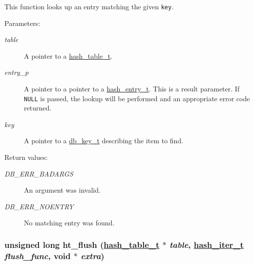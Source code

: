 This function looks up an entry matching the given {\tt key}.\begin{Desc}
\item[Parameters: ]\par
\begin{description}
\item[{\em 
table}]A pointer to a \hyperlink{group__dbprim__hash_a0}{hash\_\-table\_\-t}. \item[{\em 
entry\_\-p}]A pointer to a pointer to a \hyperlink{group__dbprim__hash_a1}{hash\_\-entry\_\-t}. This is a result parameter. If {\tt NULL} is passed, the lookup will be performed and an appropriate error code returned.  \item[{\em 
key}]A pointer to a \hyperlink{group__dbprim_a0}{db\_\-key\_\-t} describing the item to find.\end{description}
\end{Desc}
\begin{Desc}
\item[Return values: ]\par
\begin{description}
\item[{\em 
DB\_\-ERR\_\-BADARGS}]An argument was invalid. \item[{\em 
DB\_\-ERR\_\-NOENTRY}]No matching entry was found. \end{description}
\end{Desc}
\hypertarget{group__dbprim__hash_a12}{
\subsubsection[ht\_\-flush]{\setlength{\rightskip}{0pt plus 5cm}unsigned long ht\_\-flush (\hyperlink{group__dbprim__hash_a0}{hash\_\-table\_\-t} $\ast$ {\em table}, \hyperlink{group__dbprim__hash_a2}{hash\_\-iter\_\-t} {\em flush\_\-func}, void $\ast$ {\em extra})}}
\label{group__dbprim__hash_a12}


